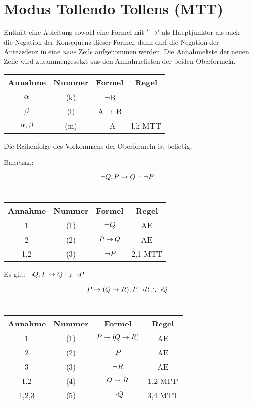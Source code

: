 \documentclass{sajzk}
\begin{document}
\section{Modus Tollendo Tollens (MTT)}
\label{30ol}

Enthält eine Ableitung sowohl eine Formel mit $'\rightarrow'$ als Hauptjunktor
als auch die Negation der Konsequenz dieser Formel, dann darf die Negation der
Antezedenz in eine \textit{neue} Zeile aufgenommen werden. Die Annahmeliste der
neuen Zeile wird zusammengesetzt aus den Annahmelisten der beiden Oberformeln.

\begin{center}
\begin{tabular}{|c|c|c|c|}
  \hline
  Annahme         & Nummer & Formel        & Regel \\
  \hline
  $\alpha$        & (k)    & $\lnot$B      &  \\
  \hline
  $\beta$         & (l)    & A $\rightarrow$ B     &  \\
  \hline
  $\alpha, \beta$ & (m)    & $\lnot$A      & l,k MTT \\
  \hline
\end{tabular}
\end{center}

Die Reihenfolge des Vorkommens der Oberformeln ist beliebig.

\textsc{Beispiele:}
\begin{center}
    \[\lnot Q, P \rightarrow Q \therefore \lnot P\] \\

\begin{tabular}{|c|c|c|c|}
  \hline
  Annahme         & Nummer  & Formel & Regel \\
  \hline
  1   & (1)    & $\lnot Q$  & AE \\
  \hline
  2   & (2)    & $P \rightarrow Q$  & AE \\
  \hline
  1,2 & (3)    & $\lnot P$  & 2,1 MTT \\
  \hline
\end{tabular}
\end{center}

Es gilt: $\lnot Q, P \rightarrow Q \vdash_J \lnot P$
\newpage
\begin{center}
    \[P \rightarrow (Q\rightarrow R), P ,\lnot R \therefore \lnot Q\] \\

\begin{tabular}{|c|c|c|c|}
  \hline
  Annahme        & Nummer & Formel   & Regel \\
  \hline
  1     & (1)    & $P \rightarrow (Q\rightarrow R)$  & AE \\
  \hline
  2     & (2)    & $P$               & AE \\
  \hline
  3     & (3)    & $\lnot R$         & AE \\
  \hline
  1,2   & (4)    & $Q \rightarrow R$         & 1,2 MPP \\
  \hline
  1,2,3 & (5)    & $\lnot Q$         & 3,4 MTT \\
  \hline
\end{tabular}
\end{center}
\end{document}
